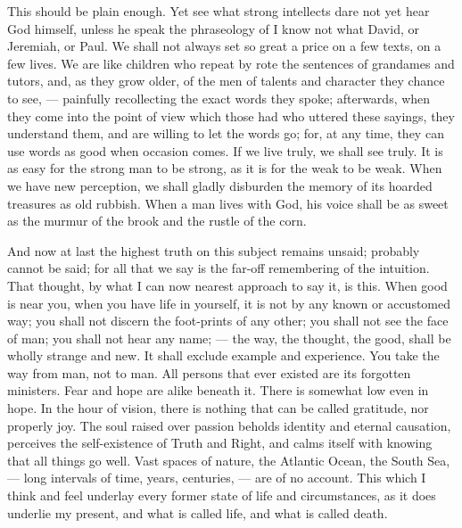 \documentclass{article}
\begin{document}
This should be plain enough. Yet see what strong intellects dare not yet
hear God himself, unless he speak the phraseology of I know not what David,
or Jeremiah, or Paul. We shall not always set so great a price on a few
texts, on a few lives. We are like children who repeat by rote the sentences
of grandames and tutors, and, as they grow older, of the men of talents and
character they chance to see, --- painfully recollecting the exact words they
spoke; afterwards, when they come into the point of view which those had who
uttered these sayings, they understand them, and are willing to let the
words go; for, at any time, they can use words as good when occasion comes.
If we live truly, we shall see truly. It is as easy for the strong man to be
strong, as it is for the weak to be weak. When we have new perception, we
shall gladly disburden the memory of its hoarded treasures as old rubbish.
When a man lives with God, his voice shall be as sweet as the murmur of the
brook and the rustle of the corn.

And now at last the highest truth on this subject remains unsaid; probably
cannot be said; for all that we say is the far-off remembering of the
intuition. That thought, by what I can now nearest approach to say it, is
this. When good is near you, when you have life in yourself, it is not by
any known or accustomed way; you shall not discern the foot-prints of any
other; you shall not see the face of man; you shall not hear any name; ---
the way, the thought, the good, shall be wholly strange and new. It shall
exclude example and experience. You take the way from man, not to man. All
persons that ever existed are its forgotten ministers. Fear and hope are
alike beneath it. There is somewhat low even in hope. In the hour of vision,
there is nothing that can be called gratitude, nor properly joy. The soul
raised over passion beholds identity and eternal causation, perceives the
self-existence of Truth and Right, and calms itself with knowing that all
things go well. Vast spaces of nature, the Atlantic Ocean, the South Sea, ---
long intervals of time, years, centuries, --- are of no account. This which I
think and feel underlay every former state of life and circumstances, as it
does underlie my present, and what is called life, and what is called death.
\end{document}
